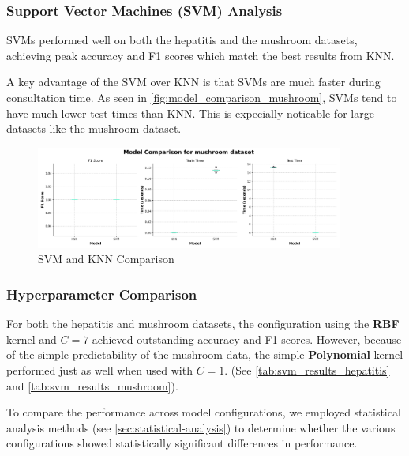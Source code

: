 \subsubsection{Support Vector Machines (SVM) Analysis}
\label{subsubsec:discussion-svm}

SVMs performed well on both the hepatitis and the mushroom datasets,
achieving peak accuracy and F1 scores which match the best results from KNN.

A key advantage of the SVM over KNN is that SVMs are much faster during consultation time. As seen in \autoref{fig:model_comparison_mushroom},
SVMs tend to have much lower test times than KNN. This is expecially noticable for large datasets like the mushroom dataset.

\begin{figure}
    \centering
    \includegraphics[width=0.9\textwidth]{figures/model_comparison_mushroom.png}
    \caption{SVM and KNN Comparison}
    \label{fig:model_comparison_mushroom}
\end{figure}


\subsubsection*{Hyperparameter Comparison}

For both the hepatitis and mushroom datasets, the configuration using the \textbf{RBF} kernel and $C=7$
achieved outstanding accuracy and F1 scores. However, because of the simple predictability
of the mushroom data, the simple \textbf{Polynomial} kernel performed just as well when used with $C=1$.
(See \autoref{tab:svm_results_hepatitis} and \autoref{tab:svm_results_mushroom}).

To compare the performance across model configurations, we employed statistical analysis methods
(see \autoref{sec:statistical-analysis}) to determine whether the various configurations showed
statistically significant differences in performance.

